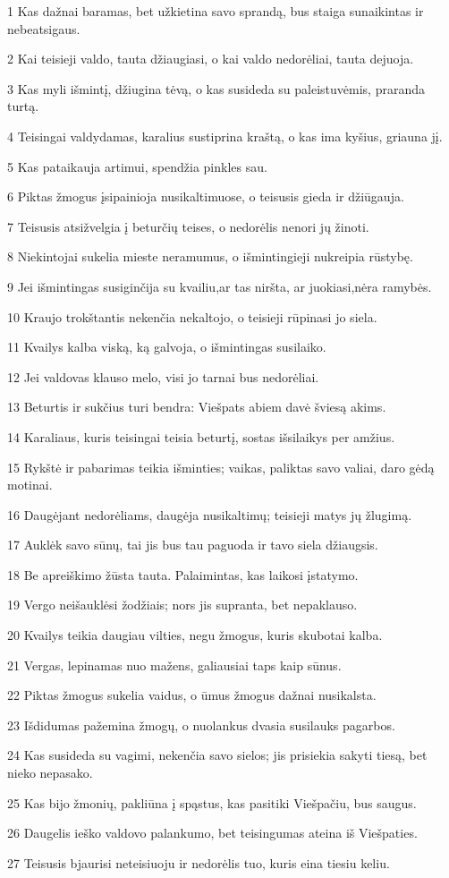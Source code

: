 \par 1 Kas dažnai baramas, bet užkietina savo sprandą, bus staiga sunaikintas ir nebeatsigaus. 
\par 2 Kai teisieji valdo, tauta džiaugiasi, o kai valdo nedorėliai, tauta dejuoja. 
\par 3 Kas myli išmintį, džiugina tėvą, o kas susideda su paleistuvėmis, praranda turtą. 
\par 4 Teisingai valdydamas, karalius sustiprina kraštą, o kas ima kyšius, griauna jį. 
\par 5 Kas pataikauja artimui, spendžia pinkles sau. 
\par 6 Piktas žmogus įsipainioja nusikaltimuose, o teisusis gieda ir džiūgauja. 
\par 7 Teisusis atsižvelgia į beturčių teises, o nedorėlis nenori jų žinoti. 
\par 8 Niekintojai sukelia mieste neramumus, o išmintingieji nukreipia rūstybę. 
\par 9 Jei išmintingas susiginčija su kvailiu,­ar tas niršta, ar juokiasi,­nėra ramybės. 
\par 10 Kraujo trokštantis nekenčia nekaltojo, o teisieji rūpinasi jo siela. 
\par 11 Kvailys kalba viską, ką galvoja, o išmintingas susilaiko. 
\par 12 Jei valdovas klauso melo, visi jo tarnai bus nedorėliai. 
\par 13 Beturtis ir sukčius turi bendra: Viešpats abiem davė šviesą akims. 
\par 14 Karaliaus, kuris teisingai teisia beturtį, sostas išsilaikys per amžius. 
\par 15 Rykštė ir pabarimas teikia išminties; vaikas, paliktas savo valiai, daro gėdą motinai. 
\par 16 Daugėjant nedorėliams, daugėja nusikaltimų; teisieji matys jų žlugimą. 
\par 17 Auklėk savo sūnų, tai jis bus tau paguoda ir tavo siela džiaugsis. 
\par 18 Be apreiškimo žūsta tauta. Palaimintas, kas laikosi įstatymo. 
\par 19 Vergo neišauklėsi žodžiais; nors jis supranta, bet nepaklauso. 
\par 20 Kvailys teikia daugiau vilties, negu žmogus, kuris skubotai kalba. 
\par 21 Vergas, lepinamas nuo mažens, galiausiai taps kaip sūnus. 
\par 22 Piktas žmogus sukelia vaidus, o ūmus žmogus dažnai nusikalsta. 
\par 23 Išdidumas pažemina žmogų, o nuolankus dvasia susilauks pagarbos. 
\par 24 Kas susideda su vagimi, nekenčia savo sielos; jis prisiekia sakyti tiesą, bet nieko nepasako. 
\par 25 Kas bijo žmonių, pakliūna į spąstus, kas pasitiki Viešpačiu, bus saugus. 
\par 26 Daugelis ieško valdovo palankumo, bet teisingumas ateina iš Viešpaties. 
\par 27 Teisusis bjaurisi neteisiuoju ir nedorėlis tuo, kuris eina tiesiu keliu.



